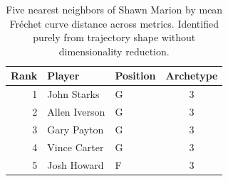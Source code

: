 \begin{table}[htbp]
  \centering\small
  \begin{tabular}{rllc}
    \toprule
    Rank & Player & Position & Archetype \\
    \midrule
    1 & John Starks & G & 3 \\
    2 & Allen Iverson & G & 3 \\
    3 & Gary Payton & G & 3 \\
    4 & Vince Carter & G & 3 \\
    5 & Josh Howard & F & 3 \\
    \bottomrule
  \end{tabular}
  \caption{Five nearest neighbors of Shawn Marion by mean Fr\'{e}chet curve distance across metrics. Identified purely from trajectory shape without dimensionality reduction.}
  \label{tab:Shawn_Marion_frechet_curve_neighbors}
\end{table}


